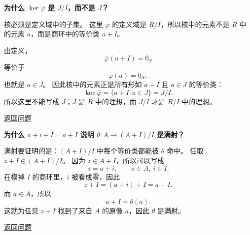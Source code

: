 \begin{exercise}\label{ex:ans-third-iso-kernel}
\hypertarget{ans:third-iso-kernel}{}
\textbf{为什么 $\ker\bar\varphi$ 是 $J/I$，而不是 $J$？}

核必须是定义域中的子集。
这里 $\bar\varphi$ 的定义域是 $R/I$，所以核中的元素不是 $R$ 中的元素 $a$，而是商环中的等价类 $a+I$。

由定义，
\[
\bar\varphi(a+I)=0_S
\]
等价于
\[
\varphi(a)=0_S,
\]
也就是 $a\in J$。
因此核中的元素正是所有形如 $a+I$ 且 $a\in J$ 的等价类：
\[
\ker\bar\varphi=\{a+I:a\in J\}=J/I.
\]
所以这里不能写成 $J$；$J$ 是 $R$ 中的理想，而 $J/I$ 才是 $R/I$ 中的理想。

\hyperlink{q:third-iso-kernel}{返回问题}
\end{exercise}

\begin{exercise}\label{ex:ans-second-iso-surjective}
\hypertarget{ans:second-iso-surjective}{}
\textbf{为什么 $a+i+I=a+I$ 说明 $\theta:A\to(A+I)/I$ 是满射？}

满射要证明的是：$(A+I)/I$ 中每个等价类都能被 $\theta$ 命中。
任取 $z+I\in (A+I)/I$。
因为 $z\in A+I$，所以可以写成
\[
z=a+i,\qquad a\in A,\ i\in I.
\]
在模掉 $I$ 的商环里，$i$ 被看成零，因此
\[
z+I=(a+i)+I=a+I.
\]
而 $a\in A$，所以
\[
a+I=\theta(a).
\]
这就为任意 $z+I$ 找到了来自 $A$ 的原像 $a$，因此 $\theta$ 是满射。

\hyperlink{q:second-iso-surjective}{返回问题}
\end{exercise}
